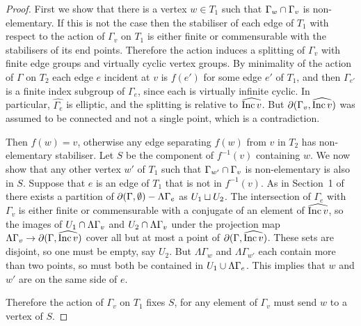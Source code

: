 \begin{proof} First we show that there is a vertex $w \in T_1$ such that
$\Gamma_w \cap \Gamma_v$ is non-elementary. If this is not the case
then the stabiliser of each edge of $T_1$ with respect to the action of
$\Gamma_v$ on $T_1$ is either finite or commensurable with the stabilisers of
its end points. Therefore the action induces a splitting of $\Gamma_v$ with
finite edge groups and virtually cyclic vertex groups. By minimality of the
action of $\Gamma$ on $T_2$ each edge $e$ incident at $v$ is $f(e')$ for some
edge $e'$ of $T_1$, and then $\Gamma_{e'}$ is a finite index subgroup of
$\Gamma_e$, since each is virtually infinite cyclic. In particular,
$\widehat{\Gamma_e}$ is elliptic, and the splitting is relative to $\widehat{\operatorname{\mathrm{Inc}} v}$.
But $\partial(\Gamma_v, \widehat{\operatorname{\mathrm{Inc}} v})$ was assumed to be connected and not a
single point, which is a contradiction.

Then $f(w) = v$, otherwise any edge separating $f(w)$ from $v$ in $T_2$ has
non-elementary stabiliser. Let $S$ be the component of $f^{-1}(v)$ containing
$w$. We now show that any other vertex $w'$ of $T_1$ such that $\Gamma_{w'}
\cap \Gamma_v$ is non-elementary is also in $S$. Suppose that $e$ is
an edge of $T_1$ that is not in $f^{-1}(v)$. As in Section~1
of~\cite{bowditch98} there exists a partition of $\partial(\Gamma, \emptyset) -
\Lambda\Gamma_e$ as $U_1 \sqcup U_2$.  The intersection of $\Gamma_e$
with $\Gamma_v$ is either finite or commensurable with a conjugate of an
element of $\widehat{\operatorname{\mathrm{Inc}} v}$, so the images of $U_1 \cap
\Lambda\Gamma_v$ and $U_2 \cap \Lambda\Gamma_v$ under the projection
map $\Lambda\Gamma_v \to \partial(\Gamma, \widehat{\operatorname{\mathrm{Inc}} v})$ cover all but at
most a point of $\partial(\Gamma, \widehat{\operatorname{\mathrm{Inc}} v})$. These sets are disjoint,
so one must be empty, say $U_2$. But $\Lambda\Gamma_w$ and $\Lambda\Gamma_{w'}$
each contain more than two points, so must both be contained in $U_1 \cup
\Lambda\Gamma_e$. This implies that $w$ and $w'$ are on the same side of $e$.

Therefore the action of $\Gamma_v$ on $T_1$ fixes $S$, for any element of
$\Gamma_v$ must send $w$ to a vertex of $S$.\end{proof}

